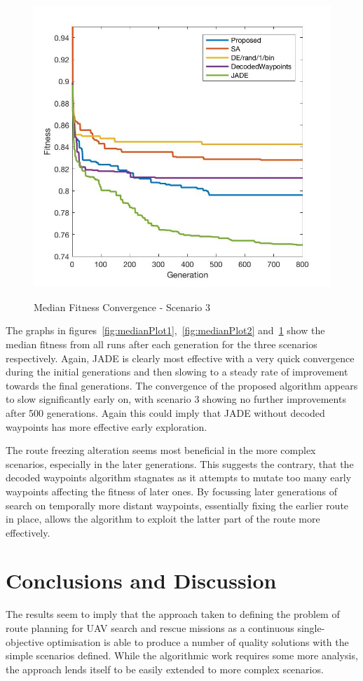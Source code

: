 \documentclass[10pt,a4paper, oneside, conference]{IEEEtran}
\begin{document}
\begin{figure}[t]
	\caption{Median Fitness Convergence - Scenario 3}
	\centering
	\includegraphics[width=0.7\linewidth]{scenario3Plot.jpg}
	\label{fig:medianPlot3}	
	\end{figure}	
	
The graphs in figures~\ref{fig:medianPlot1},~\ref{fig:medianPlot2} and~\ref{fig:medianPlot3} show the median fitness from all runs after each generation for the three scenarios respectively.
Again, JADE is clearly most effective with a very quick convergence during the initial generations and then slowing to a steady rate of improvement towards the final generations.
The convergence of the proposed algorithm appears to slow significantly early on, with scenario 3 showing no further improvements after 500 generations.
Again this could imply that JADE without decoded waypoints has more effective early exploration.

The route freezing alteration seems most beneficial in the more complex scenarios, especially in the later generations.
This suggests the contrary, that the decoded waypoints algorithm stagnates as it attempts to mutate too many early waypoints affecting the fitness of later ones.
By focussing later generations of search on temporally more distant waypoints, essentially fixing the earlier route in place, allows the algorithm to exploit the latter part of the route more effectively.
	
	\section{Conclusions and Discussion}	
	\label{section:conclusion}
	
	The results seem to imply that the approach taken to defining the problem of route planning for UAV search and rescue missions as a continuous single-objective optimisation is able to produce a number of quality solutions with the simple scenarios defined.
	While the algorithmic work requires some more analysis, the approach lends itself to be easily extended to more complex scenarios.
	
\end{document}
